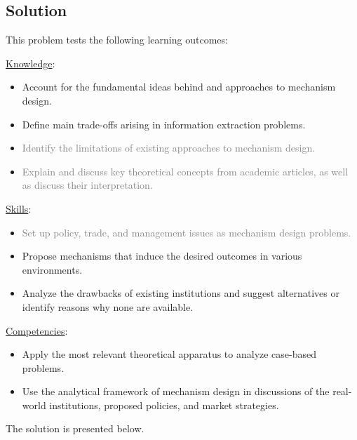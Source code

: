 \documentclass[a4paper]{article}
\begin{document}
\subsection*{Solution}
This problem tests the following learning outcomes:
\begin{framed}
	\underline{Knowledge}:
	\begin{itemize}[$\circ$]
		\item {Account for the fundamental ideas behind and approaches to mechanism design.}
		\item {Define main trade-offs arising in information extraction problems.}
		\item \textcolor{gray}{Identify the limitations of existing approaches to mechanism design.}
		\item \textcolor{gray}{Explain and discuss key theoretical concepts from academic articles, as well as discuss their interpretation.}
	\end{itemize}
	\underline{Skills}:
	\begin{itemize}[$\circ$]
		\item \textcolor{gray}{Set up policy, trade, and management issues as mechanism design problems.}
		\item {Propose mechanisms that induce the desired outcomes in various environments.}
		\item {Analyze the drawbacks of existing institutions and suggest alternatives or identify reasons why none are available.}
	\end{itemize}
	\underline{Competencies}:
	\begin{itemize}[$\circ$]
		\item {Apply the most relevant theoretical apparatus to analyze case-based problems.}
		\item {Use the analytical framework of mechanism design in discussions of the real-world institutions, proposed policies, and market strategies.}
	\end{itemize}
\end{framed}

The solution is presented below.
\end{document}
